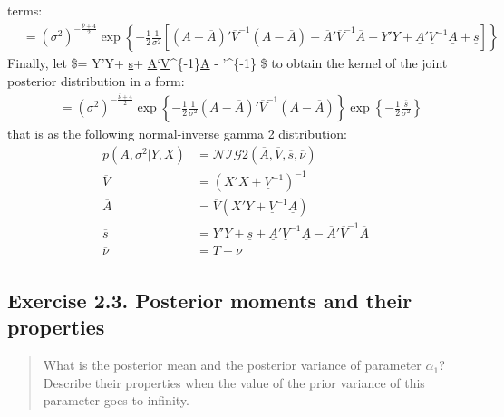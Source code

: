 \documentclass[
  letterpaper,
  DIV=11,
  numbers=noendperiod]{scrreprt}
\begin{document}
terms: \begin{align*}
&= \left(\sigma^2\right)^{-\frac{\overline{\nu}+4}{2}}
  \exp\left\{-\frac{1}{2}\frac{1}{\sigma^2}\left[  (A-\overline{A})'\overline{V}^{-1}(A-\overline{A}) - \overline{A}'\overline{V}^{-1}\overline{A} + Y'Y+ \underline{A}'\underline{V}^{-1}\underline{A} + \underline{s} \right]\right\}
\end{align*} Finally, let \$= Y'Y+ \underline{s}+
\underline{A}`\underline{V}\^{}\{-1\}\underline{A} -
'\^{}\{-1\} \$ to obtain the kernel
of the joint posterior distribution in a form: \begin{align*}
&= \left(\sigma^2\right)^{-\frac{\overline{\nu}+4}{2}}
  \exp\left\{-\frac{1}{2}\frac{1}{\sigma^2}  (A-\overline{A})'\overline{V}^{-1}(A-\overline{A})\right\} \exp\left\{-\frac{1}{2}\frac{\overline{s}}{\sigma^2} \right\}
\end{align*} that is as the following normal-inverse gamma 2
distribution: \begin{align*}
p(A,\sigma^2|Y,X) &=\mathcal{NIG}2\left(\overline{A},\overline{V}, \overline{s}, \overline{\nu}\right)\\
\overline{V} &= \left(X'X + \underline{V}^{-1}\right)^{-1}\\
\overline{A}&=\overline{V}\left( X'Y + \underline{V}^{-1}\underline{A}\right)\\
\overline{s}&=  Y'Y+ \underline{s}+ \underline{A}'\underline{V}^{-1}\underline{A} - \overline{A}'\overline{V}^{-1}\overline{A}\\
\overline{\nu}&=T+\underline{\nu}
\end{align*}

\hypertarget{exercise-2.3.-posterior-moments-and-their-properties}{%
\subsection*{Exercise 2.3. Posterior moments and their
properties}\label{exercise-2.3.-posterior-moments-and-their-properties}}

\begin{quote}
What is the posterior mean and the posterior variance of parameter
\(\alpha_1\)? Describe their properties when the value of the prior
variance of this parameter goes to infinity.
\end{quote}
\end{document}
